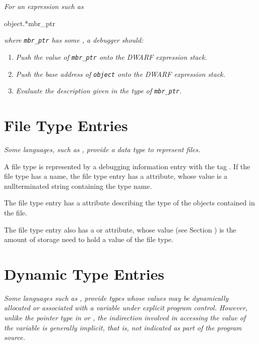 \textit{For an expression such as}

\begin{nlnlisting}
    object.*mbr_ptr
\end{nlnlisting}
\textit{where \texttt{mbr\_ptr} has some , a debugger should:}
\begin{enumerate}[1. ]
\item \textit{Push the value of \texttt{mbr\_ptr} onto the DWARF expression stack.}
\item \textit{Push the base address of \texttt{object} onto the DWARF expression stack.}
\item \textit{Evaluate the \DWATuselocation{} description
given in the type of \texttt{mbr\_ptr}.}
\end{enumerate}


\section{File Type Entries}
\label{chap:filetypeentries}

\textit{Some languages, such as ,
provide a data type to represent
files.}

A file type is represented by a debugging information entry
with
the tag
\DWTAGfiletypeTARG.
If the file type has a name,
the file type entry has a \DWATname{} attribute,
whose value
is a null\dash terminated string containing the type name.

The file type entry has
a \DWATtype{} attribute describing
the type of the objects contained in the file.

The file type entry also has a
\DWATbytesize{} or
\DWATbitsize{} attribute, whose value
(see Section )
is the amount of storage need to hold a value of the file type.

\section{Dynamic Type Entries}
\label{chap:dynamictypeentries}
\textit{Some languages such as
, provide types whose values
may be dynamically allocated or associated with a variable
under explicit program control. However, unlike the
pointer type in  or
, the indirection involved in accessing
the value of the variable is generally implicit, that is, not
indicated as part of the program source.}

